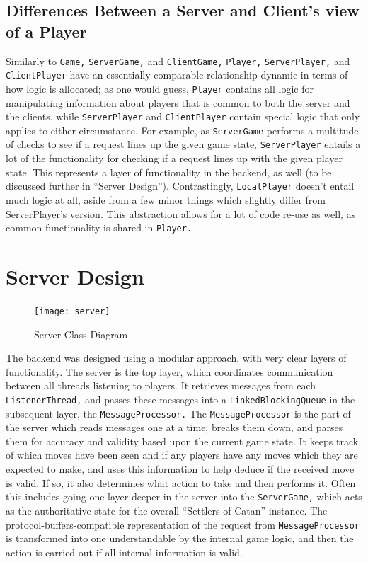 \documentclass[a4paper,doc]{apa6}
\newcommand{\code}{\texttt}
\begin{document}
\subsection{Differences Between a Server and Client's view of a Player}
Similarly to \code{Game,} \code{ServerGame,} and \code{ClientGame,} \code{Player,} \code{ServerPlayer,} and \code{ClientPlayer} have an essentially comparable relationship dynamic in terms of how logic is allocated; as one would guess, \code{Player} contains all logic for manipulating information about players that is common to both the server and the clients, while \code{ServerPlayer} and \code{ClientPlayer} contain special logic that only applies to either circumstance. For example, as \code{ServerGame} performs a multitude of checks to see if a request lines up the given game state, \code{ServerPlayer} entails a lot of the functionality for checking if a request lines up with the given player state. This represents a layer of functionality in the backend, as well (to be discussed further in “Server Design”). Contrastingly, \code{LocalPlayer} doesn’t entail much logic at all, aside from a few minor things which slightly differ from ServerPlayer’s version. This abstraction allows for a lot of code re-use as well, as common functionality is shared in \code{Player.}

\section{Server Design}
\begin{figure}[hbtp]
      \texttt{[image: server]}
      \caption{Server Class Diagram}
\end{figure}

The backend was designed using a modular approach, with very clear layers of functionality. The server is the top layer, which coordinates communication between all threads listening to players. It retrieves messages from each \code{ListenerThread,} and passes these messages into a \code{LinkedBlockingQueue} in the subsequent layer, the \code{MessageProcessor.} The \code{MessageProcessor} is the part of the server which reads messages one at a time, breaks them down, and parses them for accuracy and validity based upon the current game state. It keeps track of which moves have been seen and if any players have any moves which they are expected to make, and uses this information to help deduce if the received move is valid. If so, it also determines what action to take and then performs it. Often this includes going one layer deeper in the server into the \code{ServerGame,} which acts as the authoritative state for the overall “Settlers of Catan” instance. The protocol-buffers-compatible representation of the request from \code{MessageProcessor} is transformed into one understandable by the internal game logic, and then the action is carried out if all internal information is valid.
\end{document}
